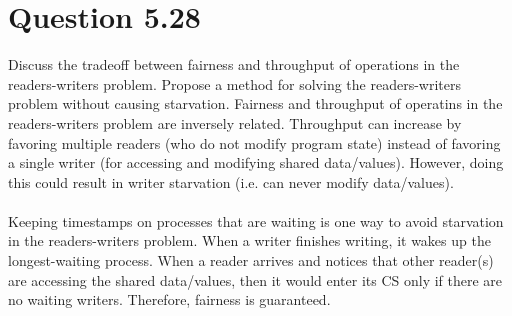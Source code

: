 \documentclass[12pt]{article}
\begin{document}
\section*{Question 5.28} {\color{blue}Discuss the tradeoff between fairness and throughput of operations in the readers-writers problem. Propose a method for solving the readers-writers problem without causing starvation.} 
Fairness and throughput of operatins in the readers-writers problem are inversely related. Throughput can increase by favoring multiple readers (who do not modify program state) instead of favoring a single writer (for accessing and modifying shared data/values). However, doing this could result in writer starvation (i.e. can never modify data/values). 
\\ \\
Keeping timestamps on processes that are waiting is one way to avoid starvation in the readers-writers problem. When a writer finishes writing, it wakes up the longest-waiting process. When a reader arrives and notices that other reader(s) are accessing the shared data/values, then it would enter its CS only if there are no waiting writers. Therefore, fairness is guaranteed.
\end{document}
